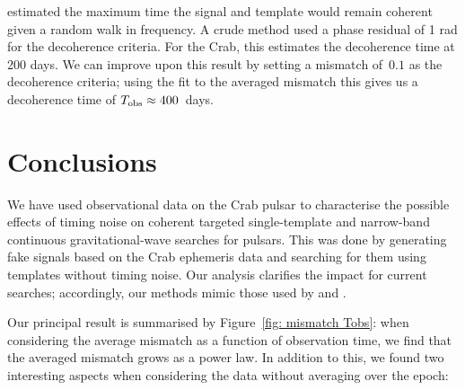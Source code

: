 \documentclass[../full_thesis/full_thesis.tex]{subfiles}
\begin{document}
\citet{Jones2004} estimated the maximum time the signal and template would
remain coherent given a random walk in  frequency. A crude method used a
phase residual of 1 rad for the decoherence criteria. For the Crab, this
estimates the decoherence time at 200 days. We can improve upon this result by
setting a mismatch of~$0.1$ as the decoherence criteria; using the fit to the
averaged mismatch this gives us a decoherence time of $T_{\textrm{obs}}\approx 400 $~days.



\section{Conclusions}
\label{sec: narrow-band conclusions}
We have used observational data on the Crab pulsar to characterise the possible
effects of timing noise on coherent targeted single-template  and narrow-band
continuous gravitational-wave searches for pulsars.  This was done by generating fake
signals based on the Crab ephemeris data and searching for them using templates
without timing noise. Our analysis clarifies the impact for current searches;
accordingly, our methods mimic those used by \citet{ligo2008} and \citet{ligo2015}.

Our principal result is summarised by Figure~\ref{fig: mismatch Tobs}:
when considering the average mismatch as
a function of observation time,  we find that the averaged
mismatch grows as a power law. In addition to this, we found two interesting
aspects when considering the data without averaging over the epoch:
\end{document}
